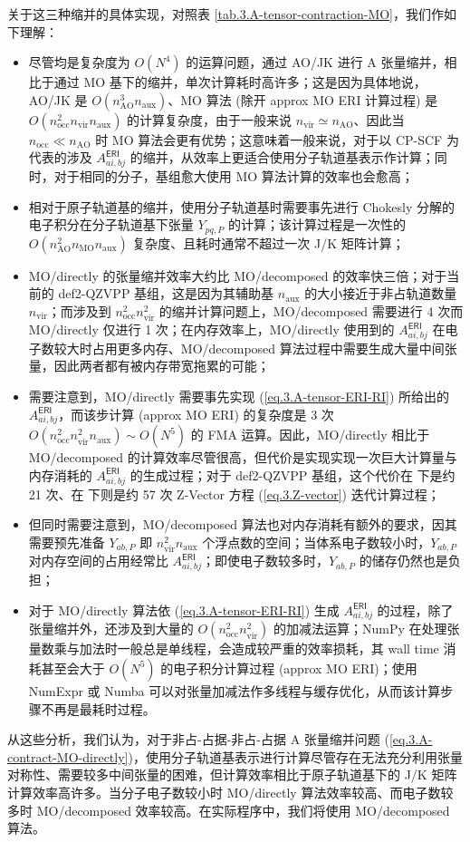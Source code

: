 关于这三种缩并的具体实现，对照表 \ref{tab.3.A-tensor-contraction-MO}，我们作如下理解：
\begin{itemize}[nosep]
  \item 尽管均是复杂度为 $O(N^4)$ 的运算问题，通过 AO/JK 进行 A 张量缩并，相比于通过 MO 基下的缩并，单次计算耗时高许多；这是因为具体地说，AO/JK 是 $O(n_\mathrm{AO}^3 n_\mathrm{aux})$、MO 算法 (除开 approx MO ERI 计算过程) 是 $O(n_\mathrm{occ}^2 n_\mathrm{vir} n_\mathrm{aux})$ 的计算复杂度，由于一般来说 $n_\mathrm{vir} \simeq n_\mathrm{AO}$、因此当 $n_\mathrm{occ} \ll n_\mathrm{AO}$ 时 MO 算法会更有优势；这意味着一般来说，对于以 CP-SCF 为代表的涉及 $A_{ai, bj}^\textsf{ERI}$ 的缩并，从效率上更适合使用分子轨道基表示作计算；同时，对于相同的分子，基组愈大使用 MO 算法计算的效率也会愈高；
  \item 相对于原子轨道基的缩并，使用分子轨道基时需要事先进行 Chokesly 分解的电子积分在分子轨道基下张量 $Y_{pq, P}$ 的计算；该计算过程是一次性的 $O(n_\mathrm{AO}^2 n_\mathrm{MO} n_\mathrm{aux})$ 复杂度、且耗时通常不超过一次 J/K 矩阵计算；
  \item MO/directly 的张量缩并效率大约比 MO/decomposed 的效率快三倍；对于当前的 def2-QZVPP 基组，这是因为其辅助基 $n_\mathrm{aux}$ 的大小接近于非占轨道数量 $n_\mathrm{vir}$；而涉及到 $n_\mathrm{occ}^2 n_\mathrm{vir}^2$ 的缩并计算问题上，MO/decomposed 需要进行 4 次而 MO/directly 仅进行 1 次；在内存效率上，MO/directly 使用到的 $A_{ai, bj}^\textsf{ERI}$ 在电子数较大时占用更多内存、MO/decomposed 算法过程中需要生成大量中间张量，因此两者都有被内存带宽拖累的可能；
  \item 需要注意到，MO/directly 需要事先实现 (\ref{eq.3.A-tensor-ERI-RI}) 所给出的 $A_{ai, bj}^\textsf{ERI}$，而该步计算 (approx MO ERI) 的复杂度是 3 次 $O(n_\mathrm{occ}^2 n_\mathrm{vir}^2 n_\mathrm{aux}) \sim O(N^5)$ 的 FMA 运算。因此，MO/directly 相比于 MO/decomposed 的计算效率尽管很高，但代价是实现实现一次巨大计算量与内存消耗的 $A_{ai, bj}^\textsf{ERI}$ 的生成过程；对于 def2-QZVPP 基组，这个代价在  下是约 21 次、在  下则是约 57 次 Z-Vector 方程 (\ref{eq.3.Z-vector}) 迭代计算过程；
  \item 但同时需要注意到，MO/decomposed 算法也对内存消耗有额外的要求，因其需要预先准备 $Y_{ab, P}$ 即 $n_\mathrm{vir}^2 n_\mathrm{aux}$ 个浮点数的空间；当体系电子数较小时，$Y_{ab, P}$ 对内存空间的占用经常比 $A_{ai, bj}^\textsf{ERI}$；即使电子数较多时，$Y_{ab, P}$ 的储存仍然也是负担；
  \item 对于 MO/directly 算法依 (\ref{eq.3.A-tensor-ERI-RI}) 生成 $A_{ai, bj}^\textsf{ERI}$ 的过程，除了张量缩并外，还涉及到大量的 $O(n_\mathrm{occ}^2 n_\mathrm{vir}^2)$ 的加减法运算；NumPy 在处理张量数乘与加法时一般总是单线程，会造成较严重的效率损耗，其 wall time 消耗甚至会大于 $O(N^5)$ 的电子积分计算过程 (approx MO ERI)；使用 NumExpr 或 Numba 可以对张量加减法作多线程与缓存优化，从而该计算步骤不再是最耗时过程。
\end{itemize}
从这些分析，我们认为，对于非占-占据-非占-占据 A 张量缩并问题 (\ref{eq.3.A-contract-MO-directly})，使用分子轨道基表示进行计算尽管存在无法充分利用张量对称性、需要较多中间张量的困难，但计算效率相比于原子轨道基下的 J/K 矩阵计算效率高许多。当分子电子数较小时 MO/directly 算法效率较高、而电子数较多时 MO/decomposed 效率较高。在实际程序中，\alert{我们将使用 MO/decomposed 算法}。

